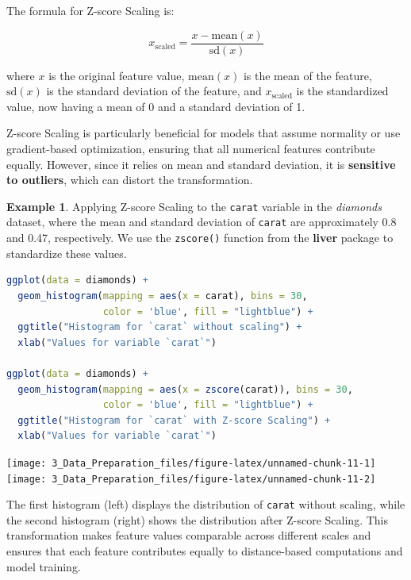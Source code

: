\documentclass[
  11pt,
]{book}
\newcommand{\passthrough}[1]{#1}
\theoremstyle{definition}
\theoremstyle{definition}
\newtheorem{example}{Example}[chapter]
\theoremstyle{definition}
\theoremstyle{definition}
\theoremstyle{remark}
\begin{document}
The formula for Z-score Scaling is:

\[
x_{\text{scaled}} = \frac{x - \text{mean}(x)}{\text{sd}(x)}
\]

where \(x\) is the original feature value, \(\text{mean}(x)\) is the mean of the feature, \(\text{sd}(x)\) is the standard deviation of the feature, and \(x_{\text{scaled}}\) is the standardized value, now having a mean of 0 and a standard deviation of 1.

Z-score Scaling is particularly beneficial for models that assume normality or use gradient-based optimization, ensuring that all numerical features contribute equally. However, since it relies on mean and standard deviation, it is \textbf{sensitive to outliers}, which can distort the transformation.

\begin{example}
\protect\hypertarget{exm:ex-zscore}{}\label{exm:ex-zscore}Applying Z-score Scaling to the \passthrough{\lstinline!carat!} variable in the \emph{diamonds} dataset, where the mean and standard deviation of \passthrough{\lstinline!carat!} are approximately 0.8 and 0.47, respectively. We use the \passthrough{\lstinline!zscore()!} function from the \textbf{liver} package to standardize these values.

\begin{lstlisting}[language=R]
ggplot(data = diamonds) +
  geom_histogram(mapping = aes(x = carat), bins = 30,
                 color = 'blue', fill = "lightblue") +
  ggtitle("Histogram for `carat` without scaling") + 
  xlab("Values for variable `carat`")

ggplot(data = diamonds) +
  geom_histogram(mapping = aes(x = zscore(carat)), bins = 30,
                 color = 'blue', fill = "lightblue") +
  ggtitle("Histogram for `carat` with Z-score Scaling") + 
  xlab("Values for variable `carat`")
\end{lstlisting}

\texttt{[image: 3\_Data\_Preparation\_files/figure-latex/unnamed-chunk-11-1]} \texttt{[image: 3\_Data\_Preparation\_files/figure-latex/unnamed-chunk-11-2]}

The first histogram (left) displays the distribution of \passthrough{\lstinline!carat!} without scaling, while the second histogram (right) shows the distribution after Z-score Scaling. This transformation makes feature values comparable across different scales and ensures that each feature contributes equally to distance-based computations and model training.
\end{example}
\end{document}

